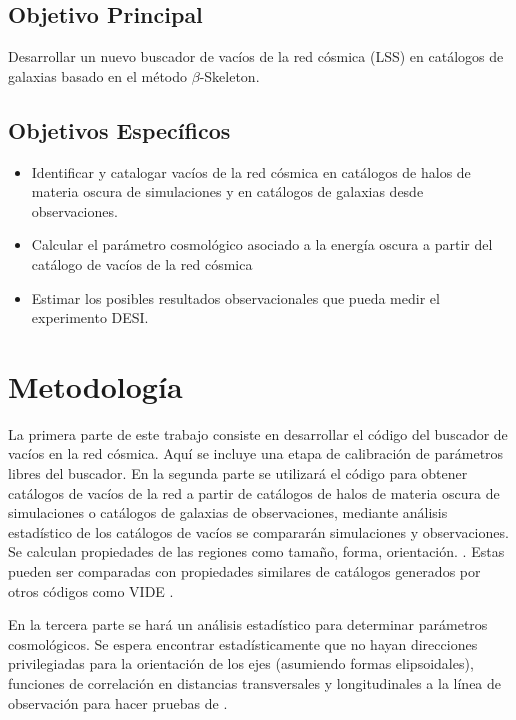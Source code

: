 \documentclass[preprint]{aastex62}
\begin{document}
  \subsection{Objetivo Principal}
  Desarrollar un nuevo buscador de vacíos de la red cósmica (LSS) en catálogos de galaxias
  basado en el método $\beta$-Skeleton.
  
  \subsection{Objetivos Específicos}

  \begin{itemize}

      \item Identificar y catalogar vacíos de la red cósmica en catálogos de halos de materia oscura de
  simulaciones y en catálogos de galaxias desde observaciones.

      \item Calcular el parámetro cosmológico asociado a la energía oscura a partir del catálogo de
  vacíos de la red cósmica

    \item  Estimar los posibles resultados observacionales que pueda medir el experimento DESI.
  \end{itemize}
  
  \section{Metodología}

  La primera parte de este trabajo consiste en desarrollar el código del buscador de vacíos
  en la red cósmica. Aquí se incluye una etapa de calibración de parámetros libres del buscador.
  En la segunda parte se utilizará el código para obtener catálogos
  de vacíos de la red a partir de catálogos de halos de materia oscura de simulaciones o
  catálogos de galaxias de observaciones, mediante análisis estadístico de los catálogos de
  vacíos se compararán simulaciones y observaciones.
  Se calculan propiedades de las regiones como tamaño, forma, orientación. \citep{El-Ad1997}.
  Estas pueden ser comparadas con propiedades similares de catálogos generados por otros códigos
  como VIDE \citep{Sutter2015}.

  En la tercera parte se hará un análisis estadístico para determinar parámetros cosmológicos.
  Se espera encontrar estadísticamente que no hayan direcciones privilegiadas para la orientación
  de los ejes (asumiendo formas elipsoidales), funciones de correlación en distancias transversales
  y longitudinales a la línea de observación para hacer pruebas de \citet{AlcockPaczynski1979}.
  
\end{document}
